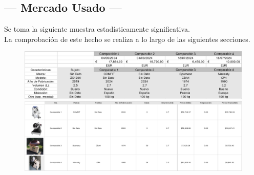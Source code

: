 \subsection{\centering --- Mercado Usado ---} %
Se toma la siguiente muestra estadísticamente significativa. \\ 
La comprobación de este hecho se realiza a lo largo de las siguientes secciones.
\begin{figure}[hbtp!]
	\centering
\includegraphics[width=  \linewidth, page = 1]{../0.imagenes/CAP_8/mercado_3_1}
\includegraphics[width=  \linewidth, page = 1]{../0.imagenes/CAP_8/mercado_3_2}
\end{figure}

